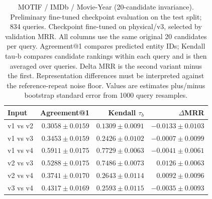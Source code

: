 \begin{table}[t]
\centering
\small
\begin{tabular}{lrrr}
\toprule
Input & Agreement@1 & Kendall $\tau_b$ & $\Delta$MRR \\
\midrule
v1 vs v2 & $0.3058 \pm 0.0159$ & $0.1309 \pm 0.0091$ & $-0.0133 \pm 0.0103$ \\
v1 vs v3 & $0.3453 \pm 0.0159$ & $0.2426 \pm 0.0102$ & $-0.0007 \pm 0.0099$ \\
v1 vs v4 & $0.5911 \pm 0.0175$ & $0.7729 \pm 0.0063$ & $-0.0041 \pm 0.0061$ \\
v2 vs v3 & $0.5288 \pm 0.0175$ & $0.7486 \pm 0.0073$ & $0.0126 \pm 0.0063$ \\
v2 vs v4 & $0.3741 \pm 0.0170$ & $0.2643 \pm 0.0114$ & $0.0092 \pm 0.0096$ \\
v3 vs v4 & $0.4317 \pm 0.0169$ & $0.2593 \pm 0.0115$ & $-0.0035 \pm 0.0093$ \\
\bottomrule
\end{tabular}
\caption{MOTIF / IMDb / Movie-Year (20-candidate invariance). Preliminary fine-tuned checkpoint evaluation on the test split; 834 queries. Checkpoint fine-tuned on physical/v3, selected by validation MRR. All columns use the same original 20 candidates per query. Agreement@1 compares predicted entity IDs; Kendall tau-b compares candidate rankings within each query and is then averaged over queries. Delta MRR is the second variant minus the first. Representation differences must be interpreted against the reference-repeat noise floor. Values are estimates plus/minus bootstrap standard error from 1000 query resamples.}
\label{tab:motif-movie_year-invariance}
\end{table}
